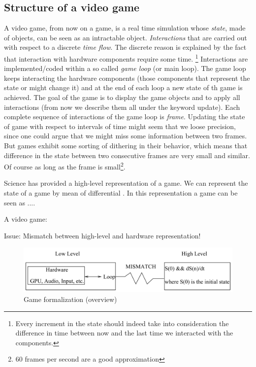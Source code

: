 \documentclass[10pt,a4paper]{article}
\begin{document}
\subsection{Structure of a video game}
A video game, from now on a game, is a real time simulation whose \textit{state}, made of objects, can be seen as an intractable object. \textit{Interactions} that are carried out with respect to a discrete \textit{time flow}. The discrete reason is explained by the fact that interaction with hardware components require some time. \footnote{Every increment in the state should indeed take into consideration the difference in time between now and the last time we interacted with the components.} Interactions are implemented/coded within a so called \textit{game loop} (or main loop). The game loop keeps interacting the hardware components (those components that represent the state or might change it) and at the end of each loop a new state of th game is achieved. The goal of the game is to display the game objects and to apply all interactions (from now we describe them all under the keyword update). Each complete sequence of interactions of the game loop is \textit{frame}. Updating the state of game with respect to intervals of time might seem that we loose precision, since one could argue that we might miss some information between two frames. But games exhibit some sorting of dithering in their behavior, which means that difference in the state between two consecutive frames are very small and similar. Of course as long as the frame is small\footnote{60 frames per second are a good approximation}. 







 
Science has provided a high-level representation of a game. We can represent the state of a game by mean of differential . In this representation a game can be seen as .... 



A video game:

Issue:
Mismatch between high-level and hardware representation!

\begin{figure}[H]
\centering
\includegraphics[scale=0.5]{games_description.png}
\caption{Game formalization (overview)}\label{game_description}
\end{figure}
\end{document}
